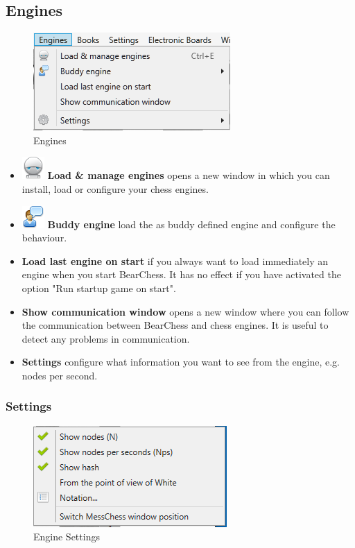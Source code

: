 \documentclass[11pt,a4paper]{article}
\begin{document}
	\subsection{Engines}
	\begin{figure}[H]
		\centering
		\includegraphics[scale=1.0]{Engines.png}
		\caption{Engines}
		\label{fig:Engines}
	\end{figure}
	\begin{itemize}
		\item  \includegraphics[scale=0.5]{robot.png} \textbf{Load \& manage engines} opens a new window in which you can install, load or configure your chess engines.
		\item  \includegraphics[scale=0.5]{user_comment.png} \textbf{Buddy engine} load the as buddy defined engine and configure the behaviour.
		\item \textbf{Load last engine on start} if you always want to load immediately an engine when you start BearChess. It has no effect if you have activated the option "Run startup game on start".
		\item \textbf{Show communication window} opens a new window where you can follow the communication between BearChess and chess engines. It is useful to detect any problems in communication.
		\item \textbf{Settings} configure what information you want to see from the engine, e.g. nodes per second.	
	\end{itemize}
	
	\subsubsection{Settings}
	\begin{figure}[H]
		\centering
		\includegraphics[scale=1.0]{engineSettings.png}
		\caption{Engine Settings}
		\label{fig:EngineSettings}
	\end{figure}
	
\end{document}
